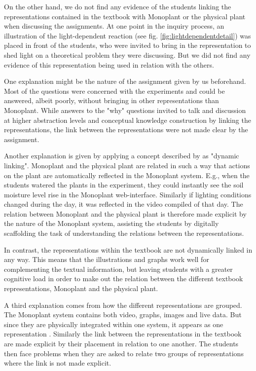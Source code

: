 On the other hand, we do not find any evidence of the students linking the representations contained in the textbook with Monoplant or the physical plant when discussing the assignments. At one point in the inquiry process, an illustration of the light-dependent reaction (see fig. \ref{fig:lightdependentdetail}) was placed in front of the students, who were invited to bring in the representation to shed light on a theoretical problem they were discussing. But we did not find any evidence of this representation being used in relation with the others. 

One explanation might be the nature of the assignment given by us beforehand. Most of the questions were concerned with the experiments and could be answered, albeit poorly, without bringing in other representations than Monoplant. While answers to the "why" questions invited to talk and discussion at higher abstraction levels and conceptual knowledge construction by linking the representations, the link between the representations were not made clear by the assignment. 

Another explanation is given by applying a concept described by \citet{van2006supporting} as "dynamic linking". Monoplant and the physical plant are related in such a way that actions on the plant are automatically reflected in the Monoplant system. E.g., when the students watered the plants in the experiment, they could instantly see the soil moisture level rise in the Monoplant web-interface. Similarly if lighting conditions changed during the day, it was reflected in the video compiled of that day. The relation between Monoplant and the physical plant is therefore made explicit by the nature of the Monoplant system, assisting the students by digitally scaffolding the task of understanding the relations between the representations. 

In contrast, the representations within the textbook are not dynamically linked in any way. This means that the illustrations and graphs work well for complementing the textual information, but leaving students with a greater cognitive load in order to make out the relation between the different textbook representations, Monoplant and the physical plant. 

A third explanation comes from how the different representations are grouped. The Monoplant system contains both video, graphs, images and live data. But since they are physically integrated within one system, it appears as one representation \citep{van2006supporting}. Similarly the link between the representations in the textbook are made explicit by their placement in relation to one another. The students then face problems when they are asked to relate two groups of representations where the link is not made explicit. 


